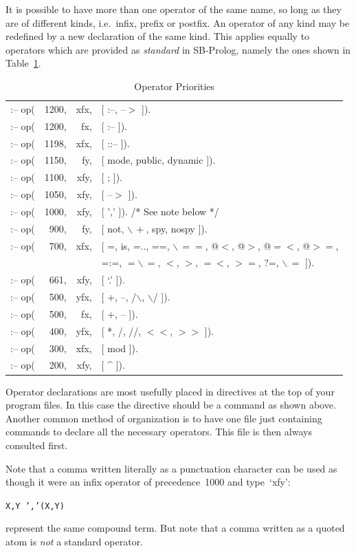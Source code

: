 It is possible to have more than one operator of the same name,
so long as they are of different kinds, i.e.\ infix, prefix or postfix.
An operator of any kind may be redefined by a new declaration of the same kind.
This applies equally to operators which are provided as
{\em standard} in SB-Prolog, namely the ones shown in Table~\ref{operator_priorities}.
\begin{table}[htbp]
\centering
\begin{tabular}{rrrl}
:-- op( & 1200, & xfx, & [ :--, --$>$ ]).\\
:-- op( & 1200, & fx,  & [ :-- ]).\\
:-- op( & 1198, & xfx, & [ ::-- ]).\\
:-- op( & 1150, & fy,  & [ mode, public, dynamic ]).\\
:-- op( & 1100,	& xfy, & [ ; ]).\\
:-- op( & 1050, & xfy, & [ --$>$ ]).\\
:-- op( & 1000, & xfy, & [ ',' ]).   /* See note below */\\
:-- op( & 900, & fy,   & [ not, $\backslash\,+$, spy, nospy ]).\\
:-- op( & 700, & xfx,  & [ =, is, =.., ==, $\backslash\,==$, @$<$, @$>$, @$=<$, @$>=$,\\
 &  &  &   =:=, $=\backslash\,=$, $<$, $>$, $=<$, $>=$, ?=, $\backslash\,=$ ]).\\
:-- op( & 661, & xfy,  & [ `.' ]).\\
:-- op( & 500, & yfx,  & [ +, --, /$\backslash$, $\backslash$/ ]).\\
:-- op( & 500, & fx,   & [ +, -- ]).\\
:-- op( & 400, & yfx,  & [ *, /, //, $<$$<$, $>$$>$ ]).\\
:-- op( & 300, & xfx,  & [ mod ]).\\
:-- op( & 200, & xfy,  & [ \^{} ]).
\end{tabular}
\caption{Operator Priorities}\label{operator_priorities}
\end{table}

Operator declarations are most usefully placed in directives at the top
of your program files.
In this case the directive should be a command as shown above.
Another common method of organization is to have one file
just containing commands to declare all the necessary operators.
This file is then always consulted first.

Note that a comma written literally as a punctuation character
can be used as though it were an infix operator of precedence~1000 and
type~`xfy':
\begin{center}
{\tt X,Y    ','(X,Y)}
\end{center}
represent the same compound term.
But note that a comma written as a quoted atom is {\em not} a standard operator.

